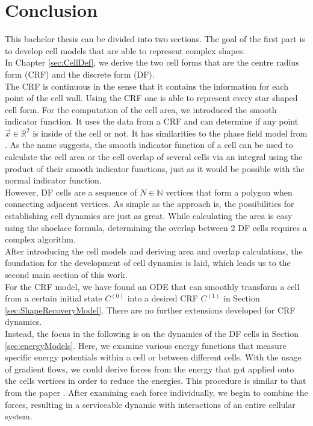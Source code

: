 \documentclass[a4paper,12pt,leqno]{article}
\theoremstyle{plain}
\theoremstyle{remark}
\newcommand{\R}{\mathbb{R}}
\newcommand{\N}{\mathbb{N}}
\begin{document}
\section{Conclusion}
This bachelor thesis can be divided into two sections. The goal of the first part is to develop cell models that are able to represent complex shapes. \\
In Chapter \ref{sec:CellDef}, we derive the two cell forms that are the centre radius form (CRF) and the discrete form (DF). \\
The CRF is continuous in the sense that it contains the information for each point of the cell wall. Using the CRF one is able to represent every star shaped cell form. For the computation of the cell area, we introduced the smooth indicator function. It uses the data from a CRF and can determine if any point $\vec{x} \in \R^2$ is inside of the cell or not. It has similarities to the phase field model from \cite{Happel2023}. As the name suggests, the smooth indicator function of a cell can be used to calculate the cell area or the cell overlap of several cells via an integral using the product of their smooth indicator functions, just as it would be possible with the normal indicator function. \\
However, DF cells are a sequence of $N \in \N$ vertices that form a polygon when connecting adjacent vertices. As simple as the approach is, the possibilities for establishing cell dynamics are just as great. While calculating the area is easy using the shoelace formula, determining the overlap between 2 DF cells requires a complex algorithm. \\
After introducing the cell models and deriving area and overlap calculations, the foundation for the development of cell dynamics is laid, which leads us to the second main section of this work. \\
For the CRF model, we have found an ODE that can smoothly transform a cell from a certain initial state $C^{(0)}$ into a desired CRF $C^{(1)}$ in Section \ref{sec:ShapeRecoveryModel}. There are no further extensions developed for CRF dynamics. \\
Instead, the focus in the following is on the dynamics of the DF cells in Section \ref{sec:energyModels}. Here, we examine various energy functions that measure specific energy potentials within a cell or between different cells. With the usage of gradient flows, we could derive forces from the energy that got applied onto the cells vertices in order to reduce the energies. This procedure is similar to that from the paper \cite{Fletcher14}. After examining each force individually, we begin to combine the forces, resulting in a serviceable dynamic with interactions of an entire cellular system. \\
\end{document}
